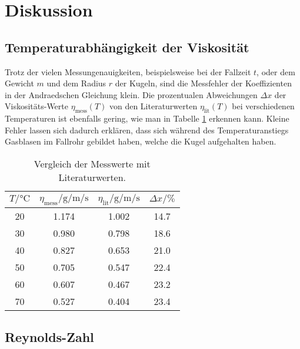 \section{Diskussion}
\label{sec:Diskussion}

\subsection{Temperaturabhängigkeit der Viskosität}

Trotz der vielen Messungenauigkeiten, beispielsweise bei der Fallzeit $t$, oder
dem Gewicht $m$ und dem Radius $r$ der Kugeln, sind die Messfehler der
Koeffizienten in der Andraedschen Gleichung klein.
Die prozentualen Abweichungen $\Delta x$ der Viskositäts-Werte
$\eta_\text{mess}(T)$ von den
Literaturwerten $\eta_\text{lit}(T)$ \cite{Viskositätliteratur}
bei verschiedenen Temperaturen ist ebenfalls gering,
wie man in Tabelle \ref{tab:VglTemperatur} erkennen kann.
Kleine Fehler lassen sich dadurch erklären, dass sich während des
Temperaturanstiegs Gasblasen im Fallrohr gebildet haben, welche die Kugel
aufgehalten haben.

\begin{table}[h]
  \centering
  \caption{Vergleich der Messwerte mit Literaturwerten.}
  \label{tab:VglTemperatur}
  \begin{tabular}{c c c c}
    \toprule
    $T/\si{\celsius}$ & $\eta_\text{mess}/\si{\gram\per\meter\per\second}$ &
    $\eta_\text{lit}/\si{\gram\per\meter\per\second}$ &
    $\Delta x/\si{\percent}$ \\
    \midrule
    20 & 1.174 & 1.002 & 14.7 \\
    30 & 0.980 & 0.798 & 18.6 \\
    40 & 0.827 & 0.653 & 21.0 \\
    50 & 0.705 & 0.547 & 22.4 \\
    60 & 0.607 & 0.467 & 23.2 \\
    70 & 0.527 & 0.404 & 23.4 \\
    \bottomrule
  \end{tabular}
\end{table}

\subsection{Reynolds-Zahl}
